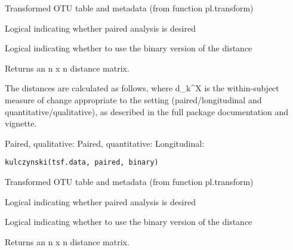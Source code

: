 \documentclass[a4paper]{book}
\begin{document}
%
\begin{Arguments}
\begin{ldescription}
\item[\code{tsf.data}] Transformed OTU table and metadata (from function pl.transform)

\item[\code{paired}] Logical indicating whether paired analysis is desired

\item[\code{binary}] Logical indicating whether to use the binary version of the distance
\end{ldescription}
\end{Arguments}
%
\begin{Value}
Returns an n x n distance matrix.
\end{Value}
%
\begin{Description}\relax
The distances are calculated as follows, where d\_k\textasciicircum{}X is the within-subject 
measure of change appropriate to the setting (paired/longitudinal and 
quantitative/qualitative), as described in the full package documentation 
and vignette. 

Paired, qualitative:  
Paired, quantitative: 
Longitudinal: 
\end{Description}
%
\begin{Usage}
\begin{verbatim}
kulczynski(tsf.data, paired, binary)
\end{verbatim}
\end{Usage}
%
\begin{Arguments}
\begin{ldescription}
\item[\code{tsf.data}] Transformed OTU table and metadata (from function pl.transform)

\item[\code{paired}] Logical indicating whether paired analysis is desired

\item[\code{binary}] Logical indicating whether to use the binary version of the distance
\end{ldescription}
\end{Arguments}
%
\begin{Value}
Returns an n x n distance matrix.
\end{Value}
\end{document}
